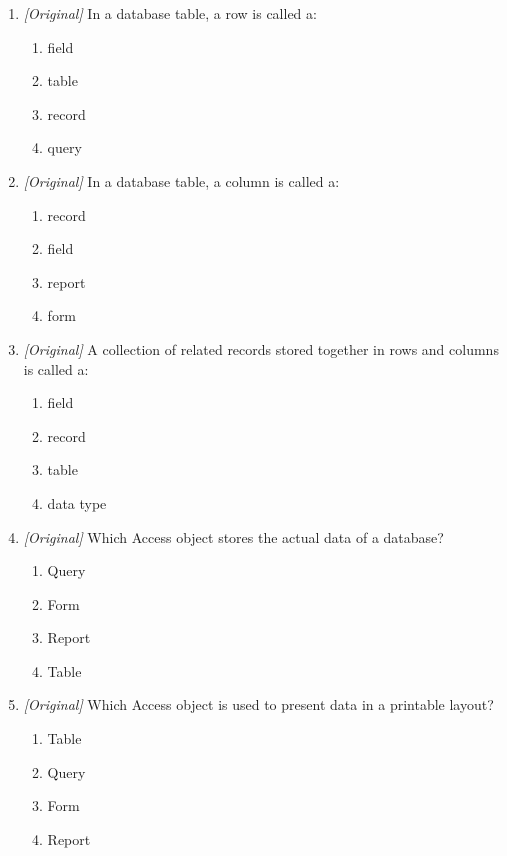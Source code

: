 \documentclass[11pt]{article}
\begin{document}
\begin{enumerate}[label=\textbf{Q\arabic*.}, leftmargin=*]
\begin{enumerate}[label=\Alph*.]
    \item Adobe Creative Cloud
    \item Google Workspace
    \item LibreOffice
  \end{enumerate}
\item \textit{[Original]} In a database table, a row is called a:
  \begin{enumerate}[label=\Alph*.]
    \item field
    \item table
    \item record
    \item query
  \end{enumerate}
\item \textit{[Original]} In a database table, a column is called a:
  \begin{enumerate}[label=\Alph*.]
    \item record
    \item field
    \item report
    \item form
  \end{enumerate}
\item \textit{[Original]} A collection of related records stored together in
  rows and columns is called a:
  \begin{enumerate}[label=\Alph*.]
    \item field
    \item record
    \item table
    \item data type
  \end{enumerate}
\item \textit{[Original]} Which Access object stores the actual data of a
  database?
  \begin{enumerate}[label=\Alph*.]
    \item Query
    \item Form
    \item Report
    \item Table
  \end{enumerate}
\item \textit{[Original]} Which Access object is used to present data in a
  printable layout?
  \begin{enumerate}[label=\Alph*.]
    \item Table
    \item Query
    \item Form
    \item Report

\end{enumerate}
\end{enumerate}
\end{document}
